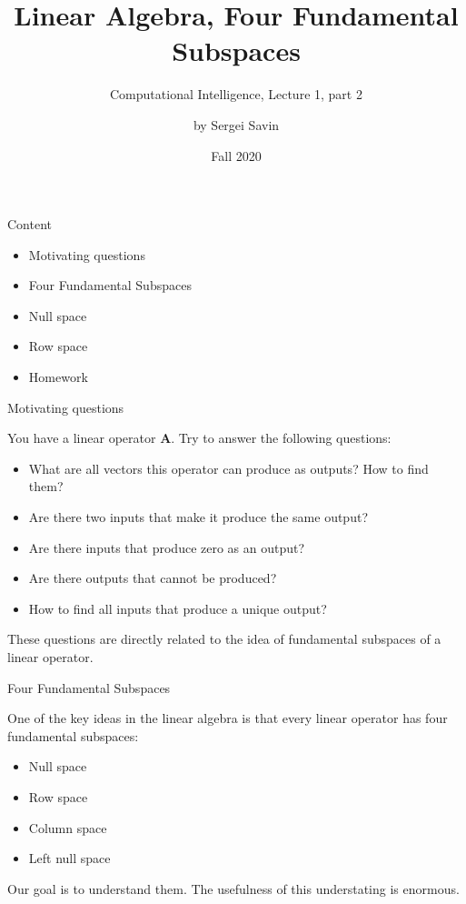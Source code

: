 \documentclass{beamer}
\title{Linear Algebra, Four Fundamental Subspaces}
\subtitle{Computational Intelligence, Lecture 1, part 2}
\author{by Sergei Savin}
\date{Fall 2020}
\begin{document}
\maketitle


\begin{frame}{Content}

\begin{itemize}
\item Motivating questions
\item Four Fundamental Subspaces
\item Null space
\item Row space
\item Homework
\end{itemize}

\end{frame}

\begin{frame}{Motivating questions}
\begin{flushleft}

You have a linear operator $\mathbf A$. Try to answer the following questions:

\begin{itemize}
    \item What are all vectors this operator can produce as outputs? How to find them?
    \item Are there two inputs that make it produce the same output?
    \item Are there inputs that produce zero as an output?
    \item Are there outputs that cannot be produced? 
    \item How to find all inputs that produce a unique output? 
\end{itemize}

These questions are directly related to the idea of fundamental subspaces of a linear operator.

\end{flushleft}
\end{frame}


\begin{frame}{Four Fundamental Subspaces}
\begin{flushleft}

One of the key ideas in the linear algebra is that every linear operator has four fundamental subspaces:

\begin{itemize}
    \item Null space
    \item Row space
    \item Column space
    \item Left null space
\end{itemize}

\bigskip

Our goal is to understand them. The usefulness of this understating is enormous.

\end{flushleft}
\end{frame}
\end{document}
